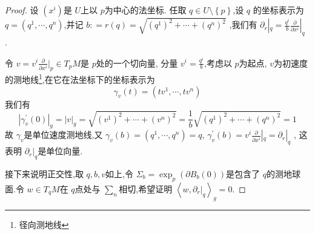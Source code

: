 \documentclass[../../几何与拓扑.tex]{subfiles}
\begin{document}
\begin{proof}
    设 \(  \left( x^{i} \right)   \)是 \(  U  \)上以  \(  p  \)为中心的法坐标.
    任取 \(  q \in U\setminus \left\{ p \right\}  \),设 \(  q  \) 的坐标表示为 \(  q= \left( q^{1},\cdots ,q^{n} \right)   \),并记 \(  b: =  r\left( q \right)= \sqrt{\left( q^{1}\right)^{2}+ \cdots + \left( q^{n} \right)^{2}  }   \)       ,我们有 \(  \partial _{r}|_{q}= \frac{q^{i} }{b }\frac{\partial }{\partial x^{i}}|_{q}   \) .
    
    令 \(  v = v^{i}\frac{\partial }{\partial x^{i}}|_{p} \in T_{p}M  \)是 \(  p  \)处的一个切向量,  分量 \(  v^{i}= \frac{q^{i} }{b }   \),考虑以 \(  p  \)为起点, \(  v  \)为初速度的测地线\footnote{径向测地线},在它在法坐标下的坐标表示为 \[
     \gamma _{v}\left( t \right)= \left( tv^{1},\cdots ,tv^{n} \right)  
    \]我们有 \[
    \left|  \gamma _{v}^{\prime} \left( 0 \right)  \right|_{g}= \left| v \right|_{g}= \sqrt{\left( v^{1} \right)^{2}+ \cdots + \left( v^{n} \right)^{2}  }= \frac{1}{b}\sqrt{\left( q^{1} \right)^{2}+ \cdots + \left( q^{n} \right)^{2}  }= 1  
    \]故 \(   \gamma _{v}  \)是单位速度测地线,又 \(   \gamma _{v}\left( b \right)= \left( q^{1},\cdots ,q^{n} \right)= q    \), \(   \gamma _{v}^{\prime} \left( b \right)=  v^{i}\frac{\partial }{\partial x^{i}}|_{q} = \partial _{r}|_{q} \)      ,
    这表明 \(  \partial _{r}|_{q}  \)是单位向量. 

    接下来说明正交性,取 \(  q,b,v  \)如上,令 \(   \Sigma _{b}= \exp _{p}\left( \partial B_{b}\left( 0 \right)  \right)   \)是包含了 \(  q  \)的测地球面.令 \(  w \in T_{q}M  \)在  \(  q  \)点处与 \(  \sum _{n}  \)相切,希望证明 \(  \left<w, \left. \partial _{r} \right|_{q} \right>_{g} = 0 \).
    

\end{proof}
\end{document}
